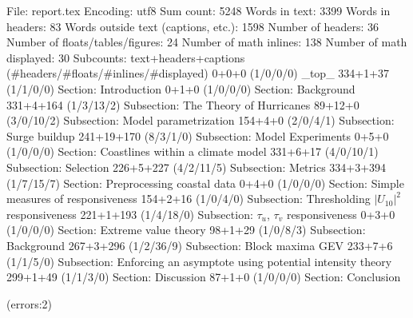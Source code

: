 
File: report.tex
Encoding: utf8
Sum count: 5248
Words in text: 3399
Words in headers: 83
Words outside text (captions, etc.): 1598
Number of headers: 36
Number of floats/tables/figures: 24
Number of math inlines: 138
Number of math displayed: 30
Subcounts:
  text+headers+captions (#headers/#floats/#inlines/#displayed)
  0+0+0 (1/0/0/0) _top_
  334+1+37 (1/1/0/0) Section: Introduction
  0+1+0 (1/0/0/0) Section: Background
  331+4+164 (1/3/13/2) Subsection: The Theory of Hurricanes
  89+12+0 (3/0/10/2) Subsection: Model parametrization
  154+4+0 (2/0/4/1) Subsection: Surge buildup
  241+19+170 (8/3/1/0) Subsection: Model Experiments
  0+5+0 (1/0/0/0) Section: Coastlines within a climate model
  331+6+17 (4/0/10/1) Subsection: Selection
  226+5+227 (4/2/11/5) Subsection: Metrics
  334+3+394 (1/7/15/7) Section: Preprocessing coastal data
  0+4+0 (1/0/0/0) Section: Simple measures of responsiveness
  154+2+16 (1/0/4/0) Subsection: Thresholding $|U_{10}|^2$ responsiveness
  221+1+193 (1/4/18/0) Subsection: $\tau_u$, $\tau_v$ responsiveness
  0+3+0 (1/0/0/0) Section: Extreme value theory
  98+1+29 (1/0/8/3) Subsection: Background
  267+3+296 (1/2/36/9) Subsection: Block maxima GEV
  233+7+6 (1/1/5/0) Subsection: Enforcing an asymptote using potential intensity theory 
  299+1+49 (1/1/3/0) Section: Discussion
  87+1+0 (1/0/0/0) Section: Conclusion

(errors:2)
